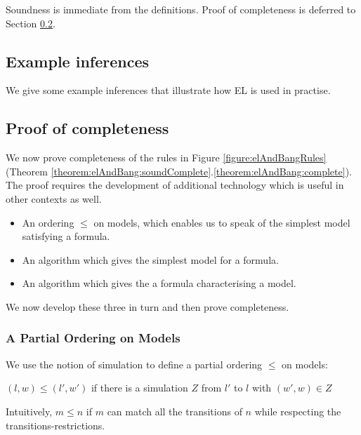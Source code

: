 \NI Soundness is immediate from the definitions. Proof of completeness is
deferred to Section \ref{completenessProof}. 

\subsection{Example inferences}

We give some example inferences that illustrate how EL is used in
practise.

\subsection{Proof of completeness}\label{completenessProof}

\NI We now prove completeness of the rules in Figure
\ref{figure:elAndBangRules} (Theorem
\ref{theorem:elAndBang:soundComplete}.\ref{theorem:elAndBang:complete}).
The proof requires the development of additional technology which is
useful in other contexts as well.

\begin{itemize}

\item An ordering $\leq$ on models, which enables us to speak of the
  simplest model satisfying a formula.

\item An algorithm which gives the simplest model for a formula.

\item An algorithm which gives the a formula characterising a model.

\end{itemize}

\NI We now develop these three in turn and then prove completeness.

\subsubsection{A Partial Ordering on  Models}

\NI We use the notion of simulation to define a partial ordering
$\leq$ on  models: \martin

\begin{definition}
$(l,w) \leq (l',w')$ if there is a simulation $Z$ from $l'$ to $l$ with $(w',w) \in Z$
\end{definition}
Intuitively, $m \leq n$ if $m$ can match all the transitions of $n$ while respecting the transitions-restrictions.


